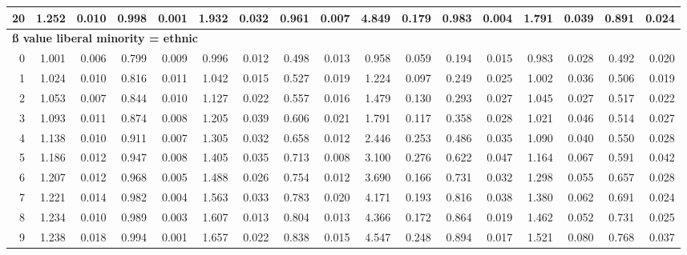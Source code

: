 \documentclass[
]{article}
\begin{document}
\begin{table}[H]
{\begin{tabular}[t]{r|r|r|r|r|r|r|r|r|r|r|r|r|r|r|r|r}
\hline
\hspace{1em}20 & 1.252 & 0.010 & 0.998 & 0.001 & 1.932 & 0.032 & 0.961 & 0.007 & 4.849 & 0.179 & 0.983 & 0.004 & 1.791 & 0.039 & 0.891 & 0.024\\
\hline
\multicolumn{17}{l}{\textbf{ß value liberal minority = ethnic}}\\
\hline
\hspace{1em}0 & 1.001 & 0.006 & 0.799 & 0.009 & 0.996 & 0.012 & 0.498 & 0.013 & 0.958 & 0.059 & 0.194 & 0.015 & 0.983 & 0.028 & 0.492 & 0.020\\
\hline
\hspace{1em}1 & 1.024 & 0.010 & 0.816 & 0.011 & 1.042 & 0.015 & 0.527 & 0.019 & 1.224 & 0.097 & 0.249 & 0.025 & 1.002 & 0.036 & 0.506 & 0.019\\
\hline
\hspace{1em}2 & 1.053 & 0.007 & 0.844 & 0.010 & 1.127 & 0.022 & 0.557 & 0.016 & 1.479 & 0.130 & 0.293 & 0.027 & 1.045 & 0.027 & 0.517 & 0.022\\
\hline
\hspace{1em}3 & 1.093 & 0.011 & 0.874 & 0.008 & 1.205 & 0.039 & 0.606 & 0.021 & 1.791 & 0.117 & 0.358 & 0.028 & 1.021 & 0.046 & 0.514 & 0.027\\
\hline
\hspace{1em}4 & 1.138 & 0.010 & 0.911 & 0.007 & 1.305 & 0.032 & 0.658 & 0.012 & 2.446 & 0.253 & 0.486 & 0.035 & 1.090 & 0.040 & 0.550 & 0.028\\
\hline
\hspace{1em}5 & 1.186 & 0.012 & 0.947 & 0.008 & 1.405 & 0.035 & 0.713 & 0.008 & 3.100 & 0.276 & 0.622 & 0.047 & 1.164 & 0.067 & 0.591 & 0.042\\
\hline
\hspace{1em}6 & 1.207 & 0.012 & 0.968 & 0.005 & 1.488 & 0.026 & 0.754 & 0.012 & 3.690 & 0.166 & 0.731 & 0.032 & 1.298 & 0.055 & 0.657 & 0.028\\
\hline
\hspace{1em}7 & 1.221 & 0.014 & 0.982 & 0.004 & 1.563 & 0.033 & 0.783 & 0.020 & 4.171 & 0.193 & 0.816 & 0.038 & 1.380 & 0.062 & 0.691 & 0.024\\
\hline
\hspace{1em}8 & 1.234 & 0.010 & 0.989 & 0.003 & 1.607 & 0.013 & 0.804 & 0.013 & 4.366 & 0.172 & 0.864 & 0.019 & 1.462 & 0.052 & 0.731 & 0.025\\
\hline
\hspace{1em}9 & 1.238 & 0.018 & 0.994 & 0.001 & 1.657 & 0.022 & 0.838 & 0.015 & 4.547 & 0.248 & 0.894 & 0.017 & 1.521 & 0.080 & 0.768 & 0.037\\

\end{tabular}}
\end{table}
\end{document}
